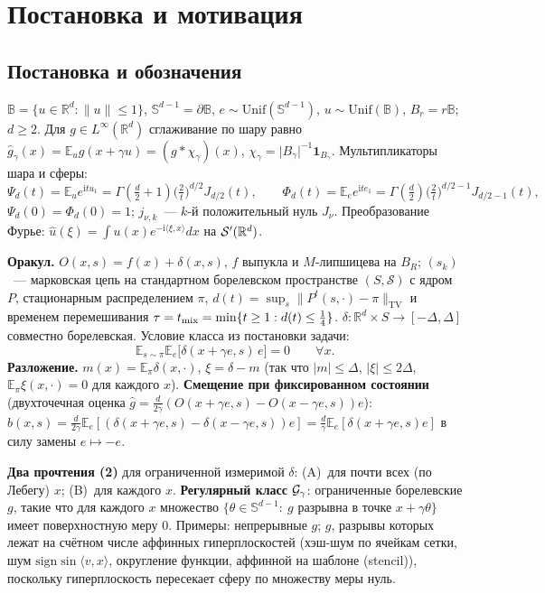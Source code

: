 \documentclass[11pt,a4paper]{article}
\numberwithin{equation}{section}
\theoremstyle{definition}
\theoremstyle{remark}
\newcommand{\E}{\mathbb E}\newcommand{\R}{\mathbb R}\newcommand{\N}{\mathbb N}\let\Prob\relax\newcommand{\Prob}{\mathbb P}
\newcommand{\norm}[1]{\lVert #1\rVert}\newcommand{\abs}[1]{\lvert #1\rvert}\newcommand{\ip}[2]{\langle #1,#2\rangle}
\newcommand{\Unif}{\mathrm{Unif}}\newcommand{\TV}{\mathrm{TV}}\newcommand{\tmix}{t_{\rm mix}}
\newcommand{\Sph}{\mathbb S^{d-1}}\newcommand{\Ball}{\mathbb B}
\begin{document}
\section{Постановка и мотивация}\label{sec:statement}
\subsection{Постановка и обозначения}
$\Ball=\{u\in\R^d:\norm u\le1\}$, $\Sph=\partial\Ball$, $e\sim\Unif(\Sph)$, $u\sim\Unif(\Ball)$, $B_r=r\Ball$; $d\ge2$.
Для $g\in L^\infty(\R^d)$ сглаживание по шару равно $\hat g_\gamma(x)=\E_u g(x+\gamma u)=(g*\chi_\gamma)(x)$, $\chi_\gamma=\abs{B_\gamma}^{-1}\mathbf 1_{B_\gamma}$.
Мультипликаторы шара и сферы:
\begin{equation}\label{eq:Psi}
\Psi_d(t)=\E_u e^{\mathrm i t u_1}=\Gamma(\tfrac d2+1)\big(\tfrac2t\big)^{d/2}J_{d/2}(t),\qquad
\Phi_d(t)=\E_e e^{\mathrm i t e_1}=\Gamma(\tfrac d2)\big(\tfrac2t\big)^{d/2-1}J_{d/2-1}(t),
\end{equation}
$\Psi_d(0)=\Phi_d(0)=1$; $j_{\nu,k}$~--- $k$-й положительный нуль $J_\nu$. Преобразование Фурье: $\hat u(\xi)=\int u(x)e^{-\mathrm i\ip\xi x}dx$ на $\cS'(\R^d)$.

\textbf{Оракул.} $O(x,s)=f(x)+\delta(x,s)$, $f$ выпукла и $M$-липшицева на $B_R$; $(s_k)$~--- марковская цепь на стандартном борелевском пространстве $(S,\mathcal S)$ с ядром $P$, стационарным распределением $\pi$,
$d(t)=\sup_{s}\norm{P^t(s,\cdot)-\pi}_\TV$ и временем перемешивания $\tau=\tmix=\min\{t\ge1:d(t)\le\frac14\}$.
$\delta:\R^d\times S\to[-\Delta,\Delta]$ совместно борелевская. Условие класса из постановки задачи:
\begin{equation}\label{eq:orth}
\E_{s\sim\pi}\E_e\big[\delta(x+\gamma e,s)\,e\big]=0\qquad\forall x. \tag{2}
\end{equation}
\textbf{Разложение.} $m(x)=\E_\pi\delta(x,\cdot)$, $\xi=\delta-m$ (так что $\abs m\le\Delta$, $\abs\xi\le2\Delta$, $\E_\pi\xi(x,\cdot)=0$ для каждого $x$).
\textbf{Смещение при фиксированном состоянии} (двухточечная оценка $\hat g=\frac d{2\gamma}(O(x+\gamma e,s)-O(x-\gamma e,s))e$):
$b(x,s)=\frac d{2\gamma}\E_e[(\delta(x+\gamma e,s)-\delta(x-\gamma e,s))e]=\frac d\gamma\E_e[\delta(x+\gamma e,s)e]$ в силу замены $e\mapsto-e$.

\textbf{Два прочтения (2)} для ограниченной измеримой $\delta$: (A)~для почти всех (по Лебегу) $x$; (B)~для каждого $x$.
\textbf{Регулярный класс} $\mathcal G_\gamma$: ограниченные борелевские $g$, такие что для каждого $x$ множество $\{\theta\in\Sph:\ g$ разрывна в точке $x+\gamma\theta\}$ имеет поверхностную меру $0$.
Примеры: непрерывные $g$; $g$, разрывы которых лежат на счётном числе аффинных гиперплоскостей (хэш-шум по ячейкам сетки, шум $\mathrm{sign}\sin\ip vx$, округление функции, аффинной на шаблоне (stencil)), поскольку гиперплоскость пересекает сферу по множеству меры нуль.
\end{document}
